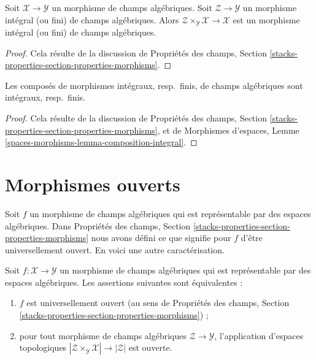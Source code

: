 \begin{lemma}
\label{lemma-base-change-integral}
Soit $\mathcal{X} \to \mathcal{Y}$ un morphisme de champs algébriques.
Soit $\mathcal{Z} \to \mathcal{Y}$ un morphisme intégral (ou fini) de champs
algébriques. Alors
$\mathcal{Z} \times_\mathcal{Y} \mathcal{X} \to \mathcal{X}$
est un morphisme intégral (ou fini) de champs algébriques.
\end{lemma}

\begin{proof}
Cela résulte de la discussion de Propriétés des champs, Section
\ref{stacks-properties-section-properties-morphisms}.
\end{proof}

\begin{lemma}
\label{lemma-composition-integral}
Les composés de morphismes intégraux, resp.\ finis, de champs algébriques sont
intégraux, resp.\ finis.
\end{lemma}

\begin{proof}
Cela résulte de la discussion de Propriétés des champs, Section
\ref{stacks-properties-section-properties-morphisms}, et de Morphismes
d'espaces, Lemme \ref{spaces-morphisms-lemma-composition-integral}.
\end{proof}




\section{Morphismes ouverts}
\label{section-open}

\noindent
Soit $f$ un morphisme de champs algébriques qui est représentable par
des espaces algébriques. Dans Propriétés des champs, Section
\ref{stacks-properties-section-properties-morphisms}
nous avons défini ce que signifie pour $f$ d'être universellement ouvert.
En voici une autre caractérisation.

\begin{lemma}
\label{lemma-characterize-representable-universally-open}
Soit $f : \mathcal{X} \to \mathcal{Y}$ un morphisme de
champs algébriques qui est représentable par des espaces algébriques.
Les assertions suivantes sont équivalentes :
\begin{enumerate}
\item $f$ est universellement ouvert (au sens de Propriétés des champs,
Section \ref{stacks-properties-section-properties-morphisms}) ;
\item pour tout morphisme de champs algébriques
$\mathcal{Z} \to \mathcal{Y}$, l'application d'espaces topologiques
$|\mathcal{Z} \times_\mathcal{Y} \mathcal{X}| \to |\mathcal{Z}|$ est ouverte.
\end{enumerate}
\end{lemma}

